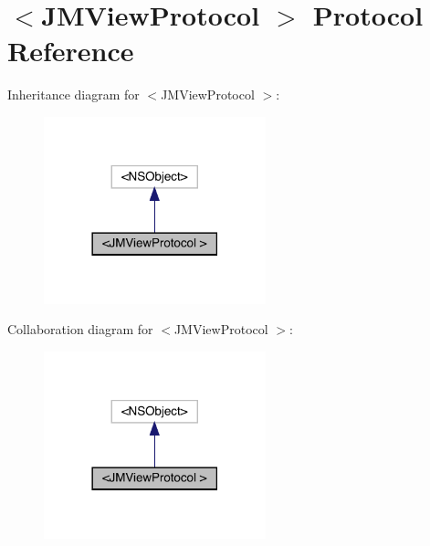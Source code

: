 \hypertarget{protocol_j_m_view_protocol_01-p}{}\section{$<$J\+M\+View\+Protocol $>$ Protocol Reference}
\label{protocol_j_m_view_protocol_01-p}


Inheritance diagram for $<$J\+M\+View\+Protocol $>$\+:\nopagebreak
\begin{figure}[H]
\begin{center}
\leavevmode
\includegraphics[width=182pt]{protocol_j_m_view_protocol_01-p__inherit__graph}
\end{center}
\end{figure}


Collaboration diagram for $<$J\+M\+View\+Protocol $>$\+:\nopagebreak
\begin{figure}[H]
\begin{center}
\leavevmode
\includegraphics[width=182pt]{protocol_j_m_view_protocol_01-p__coll__graph}
\end{center}
\end{figure}
